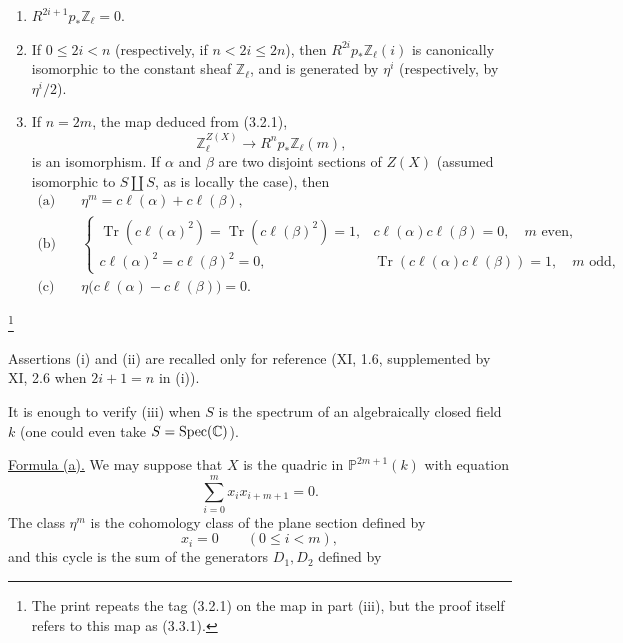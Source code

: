 \begin{enumerate}[label=(\roman*),leftmargin=2.6em]
\item $R^{2i+1}p_*\mathbb Z_\ell=0$.


\item If $0\leq 2i<n$ (respectively, if $n<2i\leq 2n$), then
$R^{2i}p_*\mathbb Z_\ell(i)$ is canonically isomorphic to the constant
sheaf $\mathbb Z_\ell$, and is generated by $\eta^i$ (respectively, by
$\eta^i/2$).

\item If $n=2m$, the map deduced from (3.2.1),
\begin{equation}\tag{3.3.1}
\mathbb Z_\ell^{Z(X)}\longrightarrow R^np_*\mathbb Z_\ell(m),
\end{equation}
is an isomorphism.  If $\alpha$ and $\beta$ are two disjoint sections
of $Z(X)$ (assumed isomorphic to $S\amalg S$, as is locally the case),
then
\begin{align*}
\text{(a)}\quad &\eta^m=c\ell(\alpha)+c\ell(\beta),\\[1ex]
\text{(b)}\quad &
\begin{cases}
\operatorname{Tr}(c\ell(\alpha)^2)
=\operatorname{Tr}(c\ell(\beta)^2)=1,
& c\ell(\alpha)c\ell(\beta)=0,\quad m\text{ even},\\[1ex]
c\ell(\alpha)^2=c\ell(\beta)^2=0,
& \operatorname{Tr}(c\ell(\alpha)c\ell(\beta))=1,
  \quad m\text{ odd},
\end{cases}\\[1ex]
\text{(c)}\quad &\eta\bigl(c\ell(\alpha)-c\ell(\beta)\bigr)=0.
\end{align*}
\end{enumerate}

\footnote{The print repeats the tag (3.2.1) on the map in part (iii),
but the proof itself refers to this map as (3.3.1).}

Assertions (i) and (ii) are recalled only for reference (XI, 1.6,
supplemented by XI, 2.6 when $2i+1=n$ in (i)).

It is enough to verify (iii) when $S$ is the spectrum of an
algebraically closed field $k$ (one could even take
$S=\operatorname{Spec}(\mathbb C)$).

\underline{Formula (a).}  We may suppose that $X$ is the quadric in
$\mathbb P^{2m+1}(k)$ with equation
\begin{equation*}
\sum_{i=0}^{m}x_i x_{i+m+1}=0.
\end{equation*}
The class $\eta^m$ is the cohomology class of the plane section defined
by
\begin{equation*}
x_i=0\qquad(0\leq i<m),
\end{equation*}
and this cycle is the sum of the generators $D_1,D_2$ defined by

